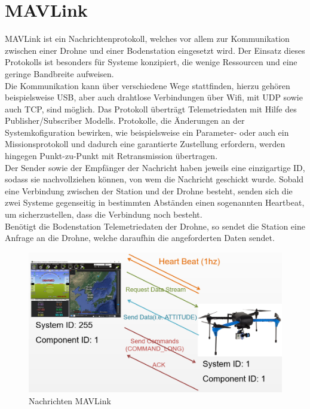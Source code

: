 \section{MAVLink} \label{mavlink}
\ac{MAVLink} ist ein Nachrichtenprotokoll, welches vor allem zur Kommunikation zwischen einer Drohne und einer Bodenstation eingesetzt wird. Der Einsatz dieses Protokolls ist besonders für Systeme konzipiert, die wenige Ressourcen und eine geringe Bandbreite aufweisen.\\
Die Kommunikation kann über verschiedene Wege stattfinden, hierzu gehören beispielsweise \ac{USB}, aber auch drahtlose Verbindungen über Wifi, mit \ac{UDP} sowie auch \ac{TCP}, sind möglich. Das Protokoll überträgt Telemetriedaten mit Hilfe des Publisher/Subscriber Modells. Protokolle, die Änderungen an der Systemkofiguration bewirken, wie beispielsweise ein Parameter- oder auch ein Missionsprotokoll und dadurch eine garantierte Zustellung erfordern, werden hingegen Punkt-zu-Punkt mit Retransmission übertragen. 
\\
Der Sender sowie der Empfänger der Nachricht haben jeweils eine einzigartige ID, sodass sie nachvollziehen können, von wem die Nachricht geschickt wurde. Sobald eine Verbindung zwischen der Station und der Drohne besteht, senden sich die zwei Systeme gegenseitig in bestimmten Abständen einen sogenannten Heartbeat, um sicherzustellen, dass die Verbindung noch besteht.
\\
Benötigt die Bodenstation Telemetriedaten der Drohne, so sendet die Station eine Anfrage an die Drohne, welche daraufhin die angeforderten Daten sendet. \cite{mavlink}

\begin{figure}[H]
    \begin{centering}
        \includegraphics[scale=0.4]{images/mavlink-message-flow.png}
        \caption{\label{img mavlink}Nachrichten MAVLink \cite{imgmavlink}}
    \end{centering}
\end{figure}


